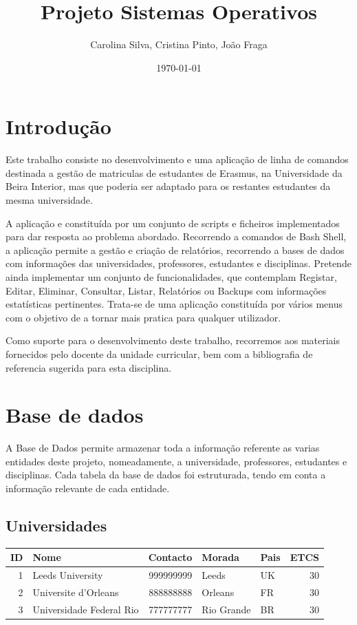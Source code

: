 \documentclass{article}
\author{Carolina Silva, Cristina Pinto, João Fraga}
\date{\today}
\title{Projeto Sistemas Operativos}
\begin{document}
\maketitle
\tableofcontents

\pagebreak{}
\section{Introdução}
\label{sec:org0490e64}

Este trabalho consiste no desenvolvimento e uma aplicação de linha de comandos destinada a gestão de matriculas de estudantes de Erasmus, na Universidade da Beira Interior, mas que poderia ser adaptado para os restantes estudantes da mesma universidade.

A aplicação e constituída por um conjunto de scripts e ficheiros implementados para dar resposta ao problema abordado.
Recorrendo a comandos de Bash Shell, a aplicação permite a gestão e criação de relatórios, recorrendo a bases de dados com informações das universidades, professores, estudantes e disciplinas.
Pretende ainda implementar um conjunto de funcionalidades, que contemplam Registar, Editar, Eliminar, Consultar, Listar, Relatórios ou Backups com informações estatísticas pertinentes.
Trata-se de uma aplicação constituída por vários menus com o objetivo de a tornar mais pratica para qualquer utilizador.

Como suporte para o desenvolvimento deste trabalho, recorremos aos materiais fornecidos pelo docente da unidade curricular, bem com a bibliografia de referencia sugerida para esta disciplina.

\section{Base de dados}
\label{sec:org6d65565}

A Base de Dados permite armazenar toda a informação referente as varias entidades deste projeto, nomeadamente, a universidade, professores, estudantes e disciplinas.
Cada tabela da base de dados foi estruturada, tendo em conta a informação relevante de cada entidade.

\subsection{Universidades}
\label{sec:orgdba02d4}

\begin{center}
\begin{tabular}{rlrllr}
\hline
ID & Nome & Contacto & Morada & Pais & ETCS\\
\hline
1 & Leeds University & 999999999 & Leeds & UK & 30\\
2 & Universite d'Orleans & 888888888 & Orleans & FR & 30\\
3 & Universidade Federal Rio & 777777777 & Rio Grande & BR & 30\\
\hline
\end{tabular}
\end{center}
\end{document}
